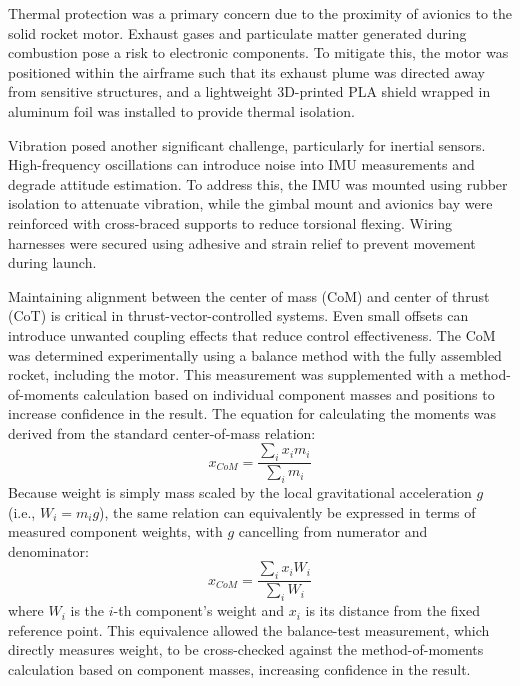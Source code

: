Thermal protection was a primary concern due to the proximity of avionics to the solid rocket motor. Exhaust gases and particulate matter generated during combustion pose a risk to electronic components. To mitigate this, the motor was positioned within the airframe such that its exhaust plume was directed away from sensitive structures, and a lightweight 3D-printed PLA shield wrapped in aluminum foil was installed to provide thermal isolation.

Vibration posed another significant challenge, particularly for inertial sensors. High-frequency oscillations can introduce noise into IMU measurements and degrade attitude estimation. To address this, the IMU was mounted using rubber isolation to attenuate vibration, while the gimbal mount and avionics bay were reinforced with cross-braced supports to reduce torsional flexing. Wiring harnesses were secured using adhesive and strain relief to prevent movement during launch.

Maintaining alignment between the center of mass (CoM) and center of thrust (CoT) is critical in thrust-vector-controlled systems. Even small offsets can introduce unwanted coupling effects that reduce control effectiveness. The CoM was determined experimentally using a balance method with the fully assembled rocket, including the motor. This measurement was supplemented with a method-of-moments calculation based on individual component masses and positions to increase confidence in the result. The equation for calculating the moments was derived from the standard center-of-mass relation:
\[
x_{CoM} = \frac{\sum_i x_i m_i}{\sum_i m_i}
\]
Because weight is simply mass scaled by the local gravitational acceleration $g$ (i.e., $W_i = m_i g$), the same relation can equivalently be expressed in terms of measured component weights, with $g$ cancelling from numerator and denominator:
\[
x_{CoM} = \frac{\sum_i x_i W_i}{\sum_i W_i}
\]
where $W_i$ is the $i$-th component's weight and $x_i$ is its distance from the fixed reference point. This equivalence allowed the balance-test measurement, which directly measures weight, to be cross-checked against the method-of-moments calculation based on component masses, increasing confidence in the result.

